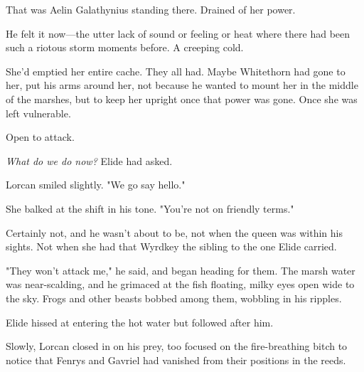 That was Aelin Galathynius standing there. Drained of her power.

He felt it now---the utter lack of sound or feeling or heat where there had been such a riotous storm moments before. A creeping cold.

She'd emptied her entire cache. They all had. Maybe Whitethorn had gone to her, put his arms around her, not because he wanted to mount her in the middle of the marshes, but to keep her upright once that power was gone. Once she was left vulnerable.

Open to attack.

\emph{What do we do now?} Elide had asked.

Lorcan smiled slightly. "We go say hello."

She balked at the shift in his tone. "You're not on friendly terms."

Certainly not, and he wasn't about to be, not when the queen was within his sights. Not when she had that Wyrdkey  the sibling to the one Elide carried.

"They won't attack me," he said, and began heading for them. The marsh water was near-scalding, and he grimaced at the fish floating, milky eyes open wide to the sky. Frogs and other beasts bobbed among them, wobbling in his ripples.

Elide hissed at entering the hot water but followed after him.

Slowly, Lorcan closed in on his prey, too focused on the fire-breathing bitch to notice that Fenrys and Gavriel had vanished from their positions in the reeds.
